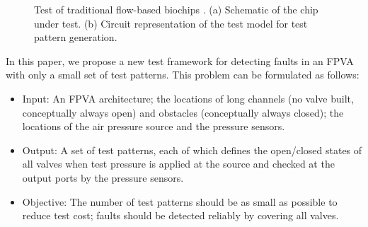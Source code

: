 \begin{figure}[t]
{\figurefontsize
\centering

\caption{Test of traditional flow-based biochips \cite{HuYHC14}. (a) Schematic of the chip under test. (b) Circuit representation of the test model for test pattern generation.}
\label{fig:classic_test}
}
\end{figure}

In this paper, we propose a new test framework for detecting faults in an FPVA
with only a small set of test patterns. This problem can be formulated as follows:
\begin{itemize}

  \item{Input:} An FPVA architecture; the locations of long channels (no valve
    built, conceptually always open) and obstacles (conceptually always
    closed); the locations of the air pressure source and the pressure sensors.

\item{Output:} A set of test patterns, each of which defines the
open/closed states of all valves when test pressure is applied
at the source and checked at the output ports by the pressure sensors.

\item{Objective:} The number of test patterns should be 
  as small as possible to reduce test cost; faults should be detected reliably by
  covering all valves.

\end{itemize}

